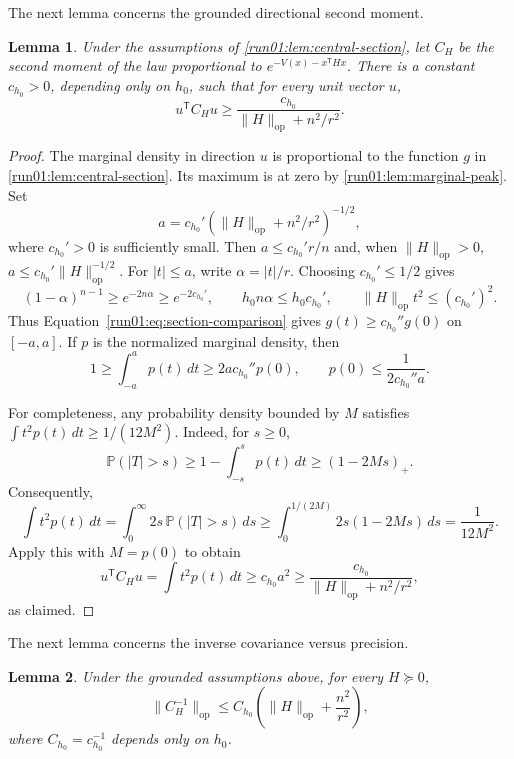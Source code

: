\documentclass[11pt]{article}
\numberwithin{equation}{section}
\newtheorem{lemma}{Lemma}[section]
\theoremstyle{definition}
\begin{document}
The next lemma concerns the grounded directional second moment.

\begin{lemma}
\label{run01:lem:directional-lower-bound}
Under the assumptions of \cref{run01:lem:central-section}, let $C_H$ be the
second moment of the law proportional to
$e^{-V(x)-x^{\mathsf T} Hx}$.
There is a constant $c_{h_0}>0$, depending only on
$h_0$, such that for every unit vector
$u$,
\begin{equation}
 u^{\mathsf T} C_Hu
 \geq\frac{c_{h_0}}{\|H\|_{\mathrm{op}}+n^2/r^2}.
 \label{run01:eq:directional-bound}
\end{equation}
\end{lemma}

\begin{proof}
The marginal density in direction $u$ is proportional to the function
$g$ in \cref{run01:lem:central-section}.
Its maximum is at zero by \cref{run01:lem:marginal-peak}.
Set
\[
 a=c_{h_0}'\left(\|H\|_{\mathrm{op}}+n^2/r^2\right)^{-1/2},
\]
where $c_{h_0}'>0$ is sufficiently small.
Then $a\leq c_{h_0}'r/n$ and, when
$\|H\|_{\mathrm{op}}>0$,
$a\leq c_{h_0}'\|H\|_{\mathrm{op}}^{-1/2}$.
For $|t|\leq a$, write
$\alpha=|t|/r$.
Choosing $c_{h_0}'\leq1/2$ gives
\[
(1-\alpha)^{n-1}
\geq e^{-2n\alpha}
\geq e^{-2c_{h_0}'},
\qquad
h_0n\alpha\leq h_0c_{h_0}',
\qquad
\|H\|_{\mathrm{op}}t^2\leq(c_{h_0}')^2.
\]
Thus Equation~\eqref{run01:eq:section-comparison} gives $g(t)\geq c_{h_0}''g(0)$
on
$[-a,a]$.
If $p$ is the normalized marginal density, then
\[
1
\geq\int_{-a}^ap(t)\,dt
\geq2ac_{h_0}''p(0),
\qquad
p(0)\leq\frac{1}{2c_{h_0}''a}.
\]

For completeness, any probability density bounded by $M$ satisfies
$\int t^2p(t)\,dt\geq1/(12M^2)$.
Indeed, for $s\geq0$,
\[
\mathbb P(|T|>s)
\geq1-\int_{-s}^sp(t)\,dt
\geq(1-2Ms)_+.
\]
Consequently,
\[
\int t^2p(t)\,dt
=\int_0^\infty2s\,\mathbb P(|T|>s)\,ds
\geq\int_0^{1/(2M)}2s(1-2Ms)\,ds
=\frac{1}{12M^2}.
\]
Apply this with $M=p(0)$ to obtain
\[
u^{\mathsf T} C_Hu
=\int t^2p(t)\,dt
\geq c_{h_0}a^2
\geq\frac{c_{h_0}}{\|H\|_{\mathrm{op}}+n^2/r^2},
\]
as claimed.
\end{proof}

The next lemma concerns the inverse covariance versus precision.

\begin{lemma}
\label{run01:lem:inverse-covariance}
Under the grounded assumptions above, for every $H\succeq0$,
\[
 \|C_H^{-1}\|_{\mathrm{op}}
 \leq C_{h_0}\left(\|H\|_{\mathrm{op}}+\frac{n^2}{r^2}\right),
\]
where $C_{h_0}=c_{h_0}^{-1}$ depends only on
$h_0$.
\end{lemma}
\end{document}
